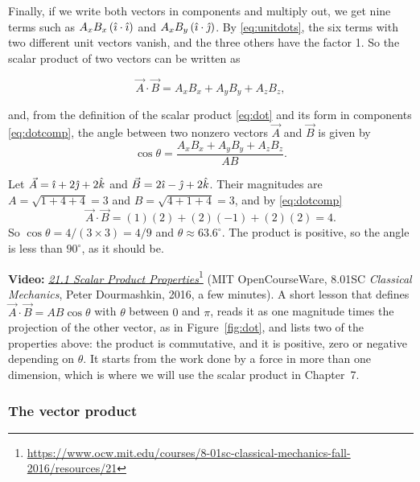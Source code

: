 \documentclass[11pt,a4paper]{article}
\begin{document}
Finally, if we write both vectors in components and multiply out, we get nine terms such as
$A_xB_x\,(\hat{\imath}\cdot\hat{\imath})$ and $A_xB_y\,(\hat{\imath}\cdot\hat{\jmath})$. By \eqref{eq:unitdots}, the six terms
with two different unit vectors vanish, and the three others have the factor 1. So the scalar
product of two vectors can be written as
\begin{keyresult}
\begin{equation}\label{eq:dotcomp}
  \vec{A}\cdot\vec{B} = A_xB_x + A_yB_y + A_zB_z ,
\end{equation}
\end{keyresult}
and, from the definition of the scalar product \eqref{eq:dot} and its form in components
\eqref{eq:dotcomp}, the angle between two nonzero vectors $\vec{A}$ and $\vec{B}$ is given by
\begin{equation}\label{eq:cosangle}
  \cos\theta = \frac{A_xB_x + A_yB_y + A_zB_z}{AB} .
\end{equation}

\begin{example}
Let $\vec{A} = \hat{\imath} + 2\hat{\jmath} + 2\hat{k}$ and $\vec{B} = 2\hat{\imath} - \hat{\jmath} + 2\hat{k}$. Their magnitudes
are $A = \sqrt{1+4+4} = 3$ and $B = \sqrt{4+1+4} = 3$, and by \eqref{eq:dotcomp}
\[
  \vec{A}\cdot\vec{B} = (1)(2) + (2)(-1) + (2)(2) = 4 .
\]
So $\cos\theta = 4/(3\times 3) = 4/9$ and $\theta \approx 63.6^\circ$. The product is positive,
so the angle is less than $90^\circ$, as it should be.
\end{example}

\begin{aside}
\textbf{Video:}
\href{https://www.ocw.mit.edu/courses/8-01sc-classical-mechanics-fall-2016/resources/21}{\emph{21.1
Scalar Product Properties}}\footnote{\url{https://www.ocw.mit.edu/courses/8-01sc-classical-mechanics-fall-2016/resources/21}}
(MIT OpenCourseWare, 8.01SC \emph{Classical Mechanics}, Peter Dourmashkin, 2016, a few minutes).
A short lesson that defines $\vec{A}\cdot\vec{B} = AB\cos\theta$ with $\theta$ between $0$ and
$\pi$, reads it as one magnitude times the projection of the other vector, as in
Figure~\ref{fig:dot}, and lists two of the properties above: the product is commutative, and it is
positive, zero or negative depending on $\theta$. It starts from the work done by a force in
more than one dimension, which is where we will use the scalar product in Chapter~7.
\end{aside}

\subsubsection{The vector product}
\end{document}
